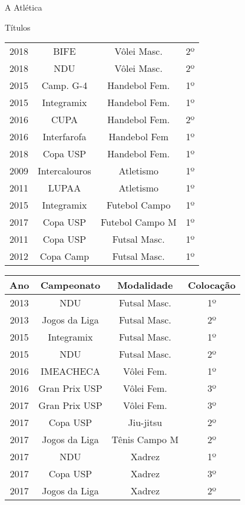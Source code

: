 \begin{secao}{A Atlética}
\begin{subsecao}{Títulos}
\begin{center}
\begin{tabular}{c|c|c|c}
    2018 & BIFE           & Vôlei Masc.     & 2º\\
    2018 & NDU            & Vôlei Masc.    & 2º\\
    2015 & Camp. G-4      & Handebol Fem.   & 1º\\
    2015 & Integramix     & Handebol Fem.   & 1º\\
    2016 & CUPA           & Handebol Fem.   & 2º\\
    2016 & Interfarofa    & Handebol Fem    & 1º\\
    2018 & Copa USP       & Handebol Fem.   & 1º\\
    2009 & Intercalouros  & Atletismo       & 1º\\
    2011 & LUPAA          & Atletismo       & 1º\\
    2015 & Integramix     & Futebol Campo   & 1º\\
    2017 & Copa USP       & Futebol Campo M & 1º\\
    2011 & Copa USP       & Futsal Masc.    & 1º\\
    2012 & Copa Camp      & Futsal Masc.    & 1º\\
         \end{tabular}
\end{center}
\begin{center}
\begin{tabular}{c|c|c|c}
Ano & Campeonato & Modalidade & Colocação\\
\hline
    2013 & NDU            & Futsal Masc.    & 1º\\
    2013 & Jogos da Liga  & Futsal Masc.    & 2º\\
    2015 & Integramix     & Futsal Masc.    & 1º\\
    2015 & NDU            & Futsal Masc.    & 2º\\
    2016 & IMEACHECA      & Vôlei Fem.      & 1º\\
    2016 & Gran Prix USP  & Vôlei Fem.      & 3º\\
    2017 & Gran Prix USP  & Vôlei Fem.      & 3º\\
    2017 & Copa USP       & Jiu-jitsu       & 2º\\
    2017 & Jogos da Liga  & Tênis Campo M   & 2º\\
    2017 & NDU            & Xadrez          & 1º\\
    2017 & Copa USP       & Xadrez          & 3º\\
    2017 & Jogos da Liga  & Xadrez          & 2º\\

\end{tabular}
\end{center}
\end{subsecao}
\end{secao}
